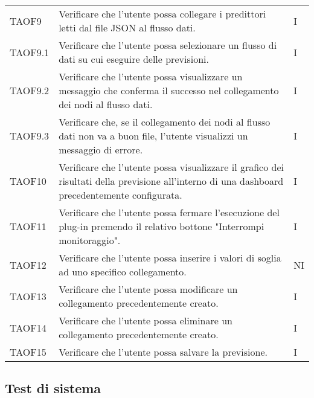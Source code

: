 \begin{longtable}{C{2.5cm} L{8cm} C{2cm}}
TAOF9 & Verificare che l’utente possa collegare i predittori letti dal file JSON al flusso dati. & I \\
TAOF9.1 & Verificare che l’utente possa selezionare un flusso di dati su cui eseguire delle previsioni. & I\\
TAOF9.2 & Verificare che l’utente possa visualizzare un messaggio che conferma il successo nel collegamento dei nodi al flusso dati. & I\\
TAOF9.3 & Verificare che, se il collegamento dei nodi al flusso dati non va a buon file, l’utente visualizzi un messaggio di errore. & I \\
TAOF10 & Verificare che l’utente possa visualizzare il grafico dei risultati della previsione all’interno di una dashboard precedentemente configurata. & I\\
TAOF11 & Verificare che l’utente possa fermare l’esecuzione del plug-in premendo il relativo bottone "Interrompi monitoraggio". & I \\
TAOF12 & Verificare che l'utente possa inserire i valori di soglia ad uno specifico collegamento. & NI \\
TAOF13 & Verificare che l'utente possa modificare un collegamento precedentemente creato. & I \\
TAOF14 & Verificare che l'utente possa eliminare un collegamento precedentemente creato. & I \\
TAOF15 & Verificare che l'utente possa salvare la previsione. & I \\

\end{longtable}

\subsection{Test di sistema}

